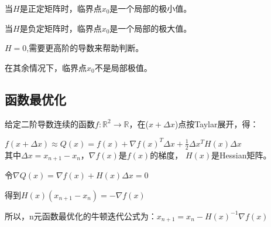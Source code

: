 \documentclass[12pt]{article}
\begin{document}
当$H$是正定矩阵时，临界点$x_0$是一个局部的极小值。

当$H$是负定矩阵时，临界点$x_0$是一个局部的极大值。

$H=0$,需要更高阶的导数来帮助判断。

在其余情况下，临界点$x_0$不是局部极值。

\subsection{函数最优化}
给定二阶导数连续的函数$f: \mathbb{R}^2 \to \mathbb{R}$，在($x+\Delta x$)点按Taylar展开，得：

$f(x+\Delta x) \approx Q(x) = f(x) + \nabla f(x)^T \Delta x + \frac{1}{2} \Delta x^T H(x) \Delta x  $  \\
其中$\Delta x = x_{n+1} - x_{n}$，$\nabla f(x)$是$f(x)$的梯度， $H(x)$是Hessian矩阵。

令$\nabla Q(x) = \nabla f(x) + H(x) \Delta x = 0$

得到$H(x) ( x_{n+1} - x_{n} ) = -\nabla f(x)$

所以，n元函数最优化的牛顿迭代公式为：$x_{n+1} = x_{n} - H(x)^{-1} \nabla f(x)$
\end{document}
